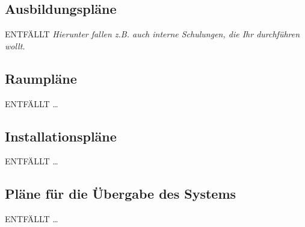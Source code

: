 \documentclass[fontsize=12pt,paper=a4,twoside]{scrartcl}
\begin{document}
\subsection{Ausbildungspläne}
ENTFÄLLT
{\em Hierunter fallen z.B. auch interne Schulungen, die Ihr
  durchführen wollt.}

\subsection{Raumpläne}
ENTFÄLLT
\dots

\subsection{Installationspläne}
ENTFÄLLT
\dots

\subsection{Pläne für die Übergabe des Systems}
ENTFÄLLT
\dots
\end{document}

